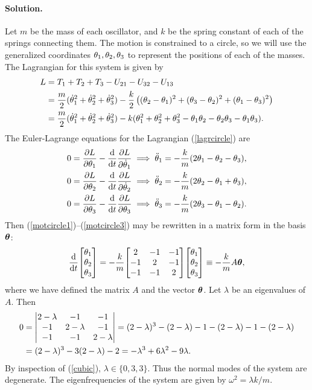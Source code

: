 \documentclass[11pt]{article}
\newcommand{\refeq}[1]{(\ref{#1})}
\newenvironment{solution}
{
    \paragraph{Solution.}
    \ignorespaces
}
{
    \bigskip
}
\begin{document}
\begin{solution}
	Let $m$ be the mass of each oscillator, and $k$ be the spring constant of each of the springs connecting them.  The motion is constrained to a circle, so we will use the generalized coordinates $\theta_1, \theta_2, \theta_3$ to represent the positions of each of the masses.  The Lagrangian for this system is given by
	\begin{align}
		L &= T_1 + T_2 + T_3 - U_{21} - U_{32} - U_{13} \\
		&= \frac{m}{2} (\dot{\theta}_1^2 + \dot{\theta}_2^2 + \dot{\theta}_3^2) - \frac{k}{2} \left( (\theta_2 - \theta_1)^2 + (\theta_3 - \theta_2)^2 + (\theta_1 - \theta_3)^2 \right) \\
		&= \frac{m}{2} (\dot{\theta}_1^2 + \dot{\theta}_2^2 + \dot{\theta}_3^2) - k (\theta_1^2 + \theta_2^2 + \theta_3^2 - \theta_1 \theta_2 - \theta_2 \theta_3 - \theta_1 \theta_3). \label{lagrcircle}
	\end{align}
	The Euler-Lagrange equations for the Lagrangian \refeq{lagrcircle} are
	\begin{align}
		0 = \pdv{L}{\theta_1} - \dv{}{t} \pdv{L}{\dot{\theta}_1} &\implies \ddot{\theta}_1 = -\frac{k}{m} (2 \theta_1 - \theta_2 - \theta_3), \label{motcircle1} \\
		0 = \pdv{L}{\theta_2} - \dv{}{t} \pdv{L}{\dot{\theta}_2} &\implies \ddot{\theta}_2 = -\frac{k}{m} (2 \theta_2 - \theta_1 + \theta_3), \label{motcircle2} \\
		0 = \pdv{L}{\theta_3} - \dv{}{t} \pdv{L}{\theta_3} &\implies \ddot{\theta}_3 = -\frac{k}{m} (2 \theta_3 - \theta_1 - \theta_2). \label{motcircle3}
	\end{align}
	Then \refeq{motcircle1}--\refeq{motcircle3} may be rewritten in a matrix form in the basis $\boldsymbol{\theta}$:
	\begin{equation}
		\dv{}{t} \mqty[ \thq \\ \thw \\ \te ] = -\frac{k}{m} \mqty[ 2 & -1 & -1 \\ -1 & 2 & -1 \\ -1 & -1 & 2 ] \mqty[ \thq \\ \thw \\ \te ] \equiv -\frac{k}{m} A \vth,
	\end{equation}
	where we have defined the matrix $A$ and the vector $\boldsymbol{\theta}$.  Let $\lambda$ be an eigenvalues of $A$.  Then
	\begin{align}
		0 &= \mdet{2 - \lambda & -1 & -1 \\ -1 & 2 - \lambda & -1 \\ -1 & -1 & 2 - \lambda} = (2 - \lambda)^3 - (2 - \lambda) - 1 - (2 - \lambda) - 1 - (2 - \lambda) \\
		&= (2 - \lambda)^3 - 3 (2 - \lambda) - 2 = -\lambda^3 + 6 \lambda^2 - 9 \lambda. \label{cubic}
	\end{align}
	By inspection of \refeq{cubic}, $\lambda \in \{ 0, 3, 3 \}$.  Thus the normal modes of the system are degenerate.  The eigenfrequencies of the system are given by $\omega^2 = \lambda k / m$.
	

\end{solution}
\end{document}
